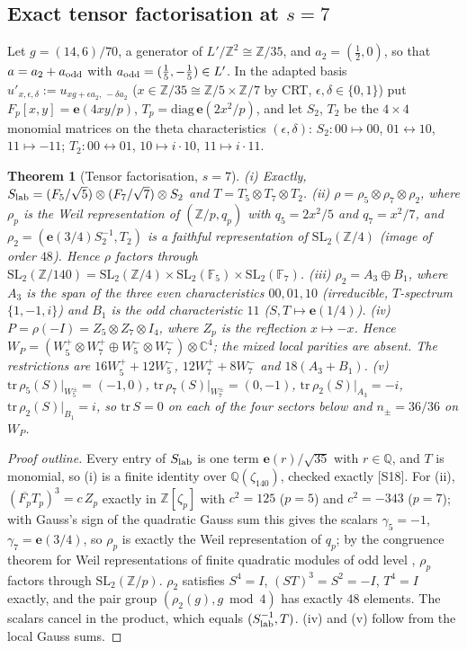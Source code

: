 \documentclass[11pt]{article}
\newtheorem{theorem}{Theorem}[section]
\theoremstyle{definition}
\newcommand{\Q}{\mathbb{Q}}
\newcommand{\Z}{\mathbb{Z}}
\newcommand{\C}{\mathbb{C}}
\newcommand{\e}{\mathbf{e}}
\newcommand{\src}[1]{\textup{[S#1]}}
\begin{document}
\subsection{Exact tensor factorisation at $s=7$}
Let $g=(14,6)/70$, a generator of $L'/\Z^2\cong\Z/35$, and $a_2=(\tfrac12,0)$, so that $a=a_2+a_{\rm odd}$ with $a_{\rm odd}=(\tfrac15,-\tfrac15)\in L'$. In the
adapted basis $u'_{x,\epsilon,\delta}:=u_{xg+\epsilon a_2,\,-\delta a_2}$ ($x\in\Z/35\cong\Z/5\times\Z/7$ by CRT, $\epsilon,\delta\in\{0,1\}$) put
$F_p[x,y]=\e(4xy/p)$, $T_p=\mathrm{diag}\,\e(2x^2/p)$, and let $S_2$, $T_2$ be the $4\times4$ monomial matrices on the theta characteristics $(\epsilon,\delta)$:
$S_2:00\mapsto00$, $01\leftrightarrow10$, $11\mapsto-11$; $T_2:00\leftrightarrow01$, $10\mapsto i\cdot10$, $11\mapsto i\cdot11$.
\begin{theorem}[Tensor factorisation, $s=7$]\label{thm:tensor7}
(i) Exactly, $S_{\rm lab}=(F_5/\sqrt5)\otimes(F_7/\sqrt7)\otimes S_2$ and $T=T_5\otimes T_7\otimes T_2$.
(ii) $\rho=\rho_5\otimes\rho_7\otimes\rho_2$, where $\rho_p$ is the Weil representation of $(\Z/p,q_p)$ with $q_5=2x^2/5$ and $q_7=x^2/7$, and
$\rho_2=(\e(3/4)S_2^{-1},T_2)$ is a faithful representation of $\mathrm{SL}_2(\Z/4)$ (image of order $48$). Hence $\rho$ factors through
$\mathrm{SL}_2(\Z/140)=\mathrm{SL}_2(\Z/4)\times\mathrm{SL}_2(\mathbb F_5)\times\mathrm{SL}_2(\mathbb F_7)$.
(iii) $\rho_2=A_3\oplus B_1$, where $A_3$ is the span of the three even characteristics $00,01,10$ (irreducible, $T$-spectrum $\{1,-1,i\}$) and $B_1$ is the odd
characteristic $11$ ($S,T\mapsto\e(1/4)$).
(iv) $P=\rho(-I)=Z_5\otimes Z_7\otimes I_4$, where $Z_p$ is the reflection $x\mapsto-x$. Hence
$W_P=(W_5^+\otimes W_7^+\oplus W_5^-\otimes W_7^-)\otimes\C^4$; the mixed local parities are absent. The restrictions are $16W_5^++12W_5^-$,
$12W_7^++8W_7^-$ and $18(A_3+B_1)$.
(v) $\mathrm{tr}\,\rho_5(S)|_{W_5^\pm}=(-1,0)$, $\mathrm{tr}\,\rho_7(S)|_{W_7^\pm}=(0,-1)$, $\mathrm{tr}\,\rho_2(S)|_{A_3}=-i$, $\mathrm{tr}\,\rho_2(S)|_{B_1}=i$, so $\mathrm{tr}\,S=0$ on each of the
four sectors below and $n_\pm=36/36$ on $W_P$.
\end{theorem}
\begin{proof}[Proof outline]
Every entry of $S_{\rm lab}$ is one term $\e(r)/\sqrt{35}$ with $r\in\Q$, and $T$ is monomial, so (i) is a finite identity over $\Q(\zeta_{140})$, checked
exactly \src{18}. For (ii), $(\overline{F_p}T_p)^3=c\,Z_p$ exactly in $\Z[\zeta_p]$ with $c^2=125$ ($p=5$) and $c^2=-343$ ($p=7$); with Gauss's sign of the quadratic
Gauss sum this gives the scalars $\gamma_5=-1$, $\gamma_7=\e(3/4)$, so $\rho_p$ is exactly the Weil representation of $q_p$; by the congruence theorem for Weil
representations of finite quadratic modules of odd level \cite{Weil}, $\rho_p$ factors through $\mathrm{SL}_2(\Z/p)$. $\rho_2$ satisfies $S^4=I$,
$(ST)^3=S^2=-I$, $T^4=I$ exactly, and the pair group $(\rho_2(g),g\bmod4)$ has exactly $48$ elements. The scalars cancel in the product, which equals
$(S_{\rm lab}^{-1},T)$. (iv) and (v) follow from the local Gauss sums.
\end{proof}
\end{document}
